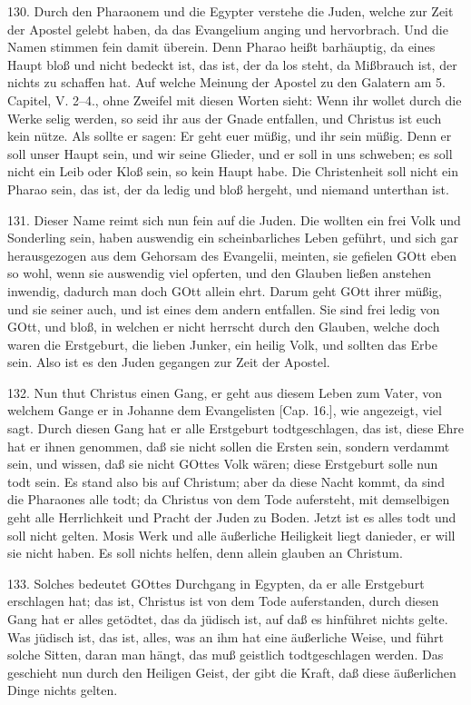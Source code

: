130. Durch den Pharaonem und die Egypter verstehe die Juden, welche zur Zeit der Apostel gelebt haben, da das Evangelium anging und hervorbrach. Und die Namen stimmen fein damit überein. Denn Pharao heißt barhäuptig, da eines Haupt bloß und nicht bedeckt ist, das ist, der da los steht, da Mißbrauch ist, der nichts zu schaffen hat. Auf welche Meinung der Apostel zu den Galatern am 5. Capitel, V. 2–4., ohne Zweifel mit diesen Worten sieht: Wenn ihr wollet durch die Werke selig werden, so seid ihr aus der Gnade entfallen, und Christus ist euch kein nütze. Als sollte er sagen: Er geht euer müßig, und ihr sein müßig. Denn er soll unser Haupt sein, und wir seine Glieder, und er soll in uns schweben; es soll nicht ein Leib oder Kloß sein, so kein Haupt habe. Die Christenheit soll nicht ein Pharao sein, das ist, der da ledig und bloß hergeht, und niemand unterthan ist.

131. Dieser Name reimt sich nun fein auf die Juden. Die wollten ein frei Volk und Sonderling sein, haben auswendig ein scheinbarliches Leben geführt, und sich gar herausgezogen aus dem Gehorsam des Evangelii, meinten, sie gefielen GOtt eben so wohl, wenn sie auswendig viel opferten, und den Glauben ließen anstehen inwendig, dadurch man doch GOtt allein ehrt. Darum geht GOtt ihrer müßig, und sie seiner auch, und ist eines dem andern entfallen. Sie sind frei ledig von GOtt,
und bloß, in welchen er nicht herrscht durch den Glauben, welche doch waren die Erstgeburt, die lieben Junker, ein heilig Volk, und sollten das Erbe sein. Also ist es den Juden gegangen zur Zeit der Apostel.

132. Nun thut Christus einen Gang, er geht aus diesem Leben zum Vater, von welchem Gange er in Johanne dem Evangelisten [Cap. 16.], wie angezeigt, viel sagt. Durch diesen Gang hat er alle Erstgeburt todtgeschlagen, das ist, diese Ehre hat er ihnen genommen, daß sie nicht sollen die Ersten sein, sondern verdammt sein, und wissen, daß sie nicht GOttes Volk wären; diese Erstgeburt solle nun todt sein. Es stand also bis auf Christum; aber da diese Nacht kommt, da sind die Pharaones alle todt; da Christus von dem Tode aufersteht, mit demselbigen geht alle Herrlichkeit und Pracht der Juden zu Boden. Jetzt ist es alles todt und soll nicht gelten. Mosis Werk und alle äußerliche Heiligkeit liegt danieder, er will sie nicht haben. Es soll nichts helfen, denn allein glauben an Christum.

133. Solches bedeutet GOttes Durchgang in Egypten, da er alle Erstgeburt erschlagen hat; das ist, Christus ist von dem Tode auferstanden, durch diesen Gang hat er alles getödtet, das da jüdisch ist, auf daß es hinführet nichts gelte. Was jüdisch ist, das ist, alles, was an ihm hat eine äußerliche Weise, und führt solche Sitten, daran man hängt, das muß geistlich todtgeschlagen werden. Das geschieht nun durch den Heiligen Geist, der gibt die Kraft, daß diese äußerlichen Dinge nichts gelten.

